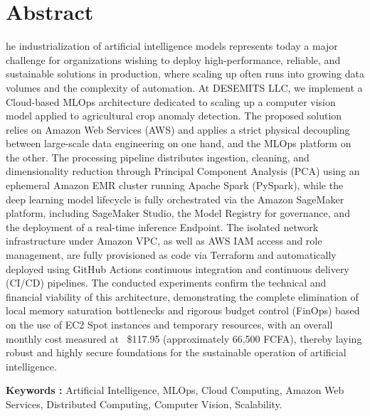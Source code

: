 
\chapter*{Abstract}

he industrialization of artificial intelligence models represents today a major challenge for organizations wishing to deploy high-performance, reliable, and sustainable solutions in production, where scaling up often runs into growing data volumes and the complexity of automation. At DESEMITS LLC, we implement a Cloud-based MLOps architecture dedicated to scaling up a computer vision model applied to agricultural crop anomaly detection. The proposed solution relies on Amazon Web Services (AWS) and applies a strict physical decoupling between large-scale data engineering on one hand, and the MLOps platform on the other. The processing pipeline distributes ingestion, cleaning, and dimensionality reduction through Principal Component Analysis (PCA) using an ephemeral Amazon EMR cluster running Apache Spark (PySpark), while the deep learning model lifecycle is fully orchestrated via the Amazon SageMaker platform, including SageMaker Studio, the Model Registry for governance, and the deployment of a real-time inference Endpoint. The isolated network infrastructure under Amazon VPC, as well as AWS IAM access and role management, are fully provisioned as code via Terraform and automatically deployed using GitHub Actions continuous integration and continuous delivery (CI/CD) pipelines. The conducted experiments confirm the technical and financial viability of this architecture, demonstrating the complete elimination of local memory saturation bottlenecks and rigorous budget control (FinOps) based on the use of EC2 Spot instances and temporary resources, with an overall monthly cost measured at ~\$117.95 (approximately 66,500 FCFA), thereby laying robust and highly secure foundations for the sustainable operation of artificial intelligence.

\vspace{0.5cm}

\textbf{Keywords :} Artificial Intelligence, MLOps, Cloud Computing, Amazon Web Services, Distributed Computing, Computer Vision, Scalability.

\clearpage